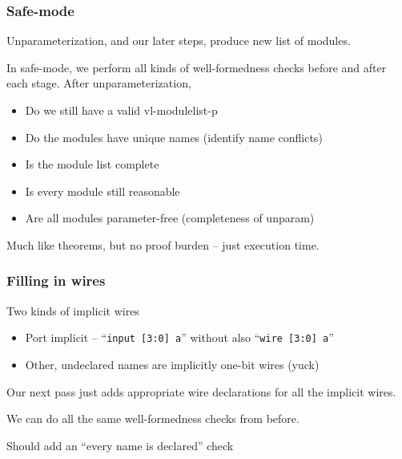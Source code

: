\documentclass[mathserif]{beamer}
\newcommand{\Highlight}[1]{{\color{Highlight}#1}}
\begin{document}
\begin{frame}
\frametitle{Safe-mode}

Unparameterization, and our later steps, produce new list of modules.

\bigskip
In \Highlight{safe-mode}, we perform all kinds of well-formedness checks
before and after each stage.  After unparameterization,
\begin{itemize}
\item Do we still have a valid vl-modulelist-p 
\item Do the modules have unique names (identify name conflicts)
\item Is the module list complete 
\item Is every module still reasonable 
\item Are all modules parameter-free (completeness of unparam)
\end{itemize}

\bigskip
Much like theorems, but no proof burden -- just execution time.
\end{frame}


\begin{frame}[fragile]
\frametitle{Filling in wires}

Two kinds of implicit wires
\begin{itemize}
\item Port implicit -- ``\texttt{input [3:0] a}'' without also ``\texttt{wire [3:0] a}''
\item Other, undeclared names are implicitly one-bit wires (yuck)
\end{itemize}

\bigskip

Our next pass just adds appropriate wire declarations for all the implicit wires.

\bigskip

We can do all the same well-formedness checks from before. 

Should add an ``every name is declared'' check

\end{frame}
\end{document}
